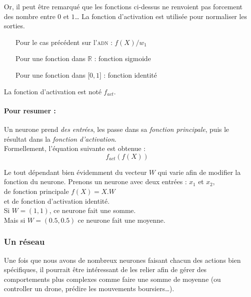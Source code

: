 Or, il peut être remarqué que les fonctions ci-dessus ne renvoient pas forcement des nombre entre $0$ et $1$\ldots
La fonction d'activation est utilisée pour normaliser les sorties.
\exemle
{
\begin{itemize}
    \item[Pour le cas précédent sur l'\textsc{adn} :] $f(X)/w_1$
    \item[Pour une fonction dans $\mathbb{R}$ :] fonction sigmoide
    \item[Pour une fonction dans $[0, 1 \rbrack$ :] fonction identité
\end{itemize}
}
La fonction d'activation est noté $f_{act}$.


\paragraph{Pour resumer :}
Un neurone prend \textit{des entrées},
les passe dans sa \textit{fonction principale},
puis le résultat dans la \textit{fonction d'activation}. \\
Formellement, l'équation suivante est obtenue :
\begin{equation}
    f_{act}(f(X))
\end{equation}


Le tout dépendant bien évidemment du vecteur $W$ qui varie afin de modifier la fonction du neurone.
\exemle
{
Prenons un neurone avec deux entrées : $x_1$ et $x_2$, \\
de fonction principale $f(X) = X.W$ \\
et de fonction d'activation identité. \\
Si $W = (1, 1)$, ce neurone fait une somme.\\
Mais si $W = (0.5, 0.5)$ ce neurone fait une moyenne.
}


\subsubsection{Un réseau}
Une fois que nous avons de nombreux neurones faisant chacun des actions bien spécifiques,
il pourrait être intéressant de les relier afin de gérer des comportements plus complexes
comme faire une somme de moyenne (ou controller un drone, prédire les mouvements boursiers\ldots).


